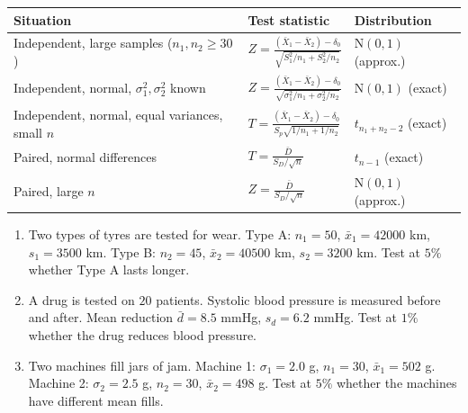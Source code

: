 \documentclass[11pt]{article}
\begin{document}
\begin{aretenir}
\begin{center}
\begin{tabularx}{\linewidth}{|l|X|X|}
\hline
\rowcolor{popblueL} \textbf{Situation} & \textbf{Test statistic} & \textbf{Distribution} \\
\hline
Independent, large samples ($n_1,n_2 \ge 30$) & $Z = \frac{(\bar{X}_1-\bar{X}_2)-\delta_0}{\sqrt{S_1^2/n_1 + S_2^2/n_2}}$ & $\mathrm{N}(0,1)$ (approx.) \\
\hline
\rowcolor{popblueL} Independent, normal, $\sigma_1^2,\sigma_2^2$ known & $Z = \frac{(\bar{X}_1-\bar{X}_2)-\delta_0}{\sqrt{\sigma_1^2/n_1 + \sigma_2^2/n_2}}$ & $\mathrm{N}(0,1)$ (exact) \\
\hline
Independent, normal, equal variances, small $n$ & $T = \frac{(\bar{X}_1-\bar{X}_2)-\delta_0}{S_p\sqrt{1/n_1+1/n_2}}$ & $t_{n_1+n_2-2}$ (exact) \\
\hline
Paired, normal differences & $T = \frac{\bar{D}}{S_D/\sqrt{n}}$ & $t_{n-1}$ (exact) \\
\hline
Paired, large $n$ & $Z = \frac{\bar{D}}{S_D/\sqrt{n}}$ & $\mathrm{N}(0,1)$ (approx.) \\
\hline
\end{tabularx}
\end{center}
\end{aretenir}

\begin{exercice}
\begin{enumerate}
\item Two types of tyres are tested for wear. Type A: $n_1 = 50$, $\bar{x}_1 = 42000$ km, $s_1 = 3500$ km. Type B: $n_2 = 45$, $\bar{x}_2 = 40500$ km, $s_2 = 3200$ km. Test at $5\%$ whether Type A lasts longer.
\item A drug is tested on $20$ patients. Systolic blood pressure is measured before and after. Mean reduction $\bar{d} = 8.5$ mmHg, $s_d = 6.2$ mmHg. Test at $1\%$ whether the drug reduces blood pressure.
\item Two machines fill jars of jam. Machine 1: $\sigma_1 = 2.0$ g, $n_1 = 30$, $\bar{x}_1 = 502$ g. Machine 2: $\sigma_2 = 2.5$ g, $n_2 = 30$, $\bar{x}_2 = 498$ g. Test at $5\%$ whether the machines have different mean fills.
\end{enumerate}
\end{exercice}
\end{document}
